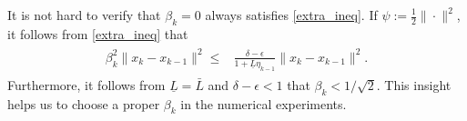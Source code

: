 \documentclass[letterpaper]{article} %
\begin{document}
	It is not hard to verify that $\beta_k=0$ always satisfies \eqref{extra_ineq}. 
	If $\psi:=\frac{1}{2}\|\cdot\|^{2}$, it follows from \eqref{extra_ineq} that 
	\begin{eqnarray}
		\begin{aligned}
			\beta_{k}^{2}\|x_{k}-x_{k-1}\|^{2}\le& \frac{\delta-\epsilon}{1+\underline{L}\eta_{k-1}}\|x_{k}-x_{k-1}\|^{2}. \end{aligned}\label{example_beta}
	\end{eqnarray}
	Furthermore, it follows from  $\underline{L}=\bar{L}$ and $\delta-\epsilon<1$ that $\beta_{k}< 1/\sqrt{2}$. 
	This insight helps us to choose a proper $\beta_k$ in the numerical experiments.
	
	
	
\end{document}
